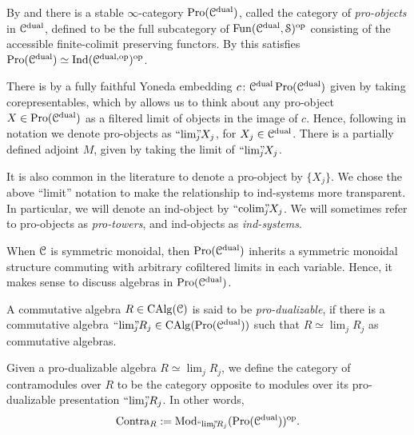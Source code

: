 \begin{construction}
    By \cite[A.8.1.1]{lurie_SAG} and \cite[2.5]{kerz-saito-tamme_2019} there is a stable $\infty$-category $\operatorname{Pro}(\EuScript{C}^{\mathrm{dual}})$, called the category of \emph{pro-objects} in $\EuScript{C}^{\mathrm{dual}}$, defined to be the full subcategory of $\operatorname{Fun}(\EuScript{C}^{\mathrm{dual}}, \EuScript{S})^{\mathrm{op}}$ consisting of the accessible finite-colimit preserving functors. By \cite[A.8.1.2]{lurie_SAG} this satisfies $\operatorname{Pro}(\EuScript{C}^{\mathrm{dual}}) \simeq \operatorname{Ind}(\EuScript{C}^{\mathrm{dual}, \mathrm{op}})^{\mathrm{op}}$. 
\end{construction}

There is by \cite[A.8.1.3]{lurie_SAG} a fully faithful Yoneda embedding $c\colon \EuScript{C}^{\mathrm{dual}} \operatorname{Pro}(\EuScript{C}^{\mathrm{dual}})$ given by taking corepresentables, which by \cite[A.8.1.5]{lurie_SAG} allows us to think about any pro-object $X \in \operatorname{Pro}(\EuScript{C}^{\mathrm{dual}})$ as a filtered limit of objects in the image of $c$. Hence, following \cite{kerz-saito-tamme_2019} in notation we denote pro-objects as $``\!\lim\!"_{\hspace{-5pt} j} X_j$, for $X_j \in \EuScript{C}^{\mathrm{dual}}$. There is a partially defined adjoint $M$, given by taking the limit of $``\!\lim\!"_{\hspace{-5pt} j} X_j$. 

\begin{remark}
    It is also common in the literature to denote a pro-object by $\{X_j\}$. We chose the above ``limit'' notation to make the relationship to ind-systems more transparent. In particular, we will denote an ind-object by $``\!\operatorname{colim}\!"_{\hspace{-5pt} j} X_j$. We will sometimes refer to pro-objects as \emph{pro-towers}, and ind-objects as \emph{ind-systems}.  
\end{remark}

When $\EuScript{C}$ is symmetric monoidal, then $\operatorname{Pro}(\EuScript{C}^{\mathrm{dual}})$ inherits a symmetric monoidal structure commuting with arbitrary cofiltered limits in each variable. Hence, it makes sense to discuss algebras in $\operatorname{Pro}(\EuScript{C}^{\mathrm{dual}})$. 

\begin{definition}
    A commutative algebra $R\in \operatorname{CAlg}(\EuScript{C})$ is said to be \emph{pro-dualizable}, if there is a commutative algebra $``\!\lim\!"_{\hspace{-5pt} j} R_j \in \operatorname{CAlg}(\operatorname{Pro}(\EuScript{C}^{\mathrm{dual}}))$ such that $R\simeq \lim_j R_j$ as commutative algebras.  
\end{definition}

\begin{definition}
    Given a pro-dualizable algebra $R \simeq \lim_j R_j$, we define the category of contramodules over $R$ to be the category opposite to modules over its pro-dualizable presentation $``\!\lim\!"_{\hspace{-5pt} j} R_j$. In other words, 
    \[\mathrm{Contra}_R := \mathrm{Mod}_{``\!\lim\!"_{\hspace{-5pt} j} R_j}(\operatorname{Pro}(\EuScript{C}^{\mathrm{dual}}))^{\mathrm{op}}.\]
\end{definition}

